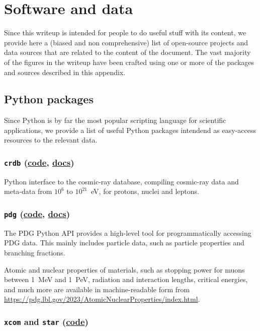 \chapter{Software and data}
\label{chap:software}


Since this writeup is intended for people to do useful stuff with its content,
we provide here a (biased and non comprehensive) list of open-source projects and
data sources that are related to the content of the document. The vast majority
of the figures in the writeup have been crafted using one or more of the packages
and sources described in this appendix.


\section{Python packages}

Since Python is by far the most popular scripting language for scientific applications,
we provide a list of useful Python packages intendend as easy-access resources
to the relevant data.


\subsection{\texttt{crdb} (\href{https://github.com/crdb-project/crdb}{code},
  \href{https://crdb.readthedocs.io/en/latest/}{docs})}

Python interface to the cosmic-ray database, compiling cosmic-ray data and meta-data
from $10^6$ to $10^{21}$~eV, for protons, nuclei and leptons.


\subsection{\texttt{pdg} (\href{https://github.com/particledatagroup/api}{code},
  \href{https://pdgapi.lbl.gov/doc/pythonapi.html}{docs})}

The PDG Python API provides a high-level tool for programmatically accessing PDG
data. This mainly includes particle data, such as particle properties and branching
fractions.

Atomic and nuclear properties of materials, such as stopping power for muons
between 1~MeV and 1~PeV, radiation and interaction lengths, critical energies, and
much more are available in machine-readable form from
\url{https://pdg.lbl.gov/2023/AtomicNuclearProperties/index.html}.


\subsection{\texttt{xcom} and \texttt{star} (\href{https://github.com/Zelenyy/nist-calculators}{code})}

